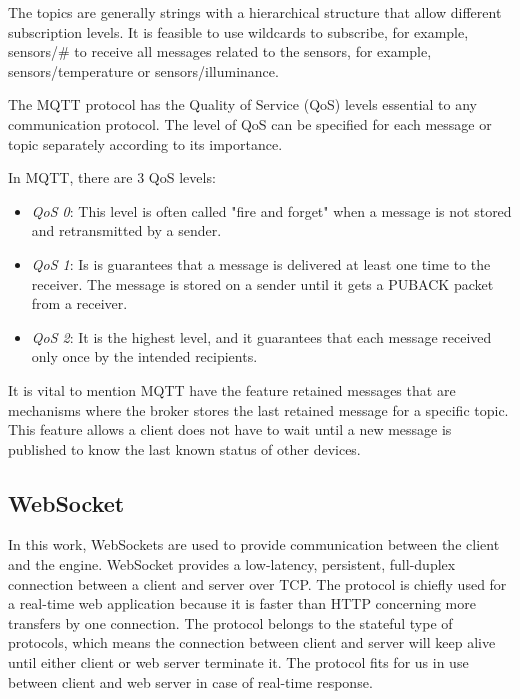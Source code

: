 The topics are generally strings with a hierarchical structure that allow different subscription levels. It is feasible to use wildcards to subscribe, for example, sensors/\# to receive all messages related to the sensors, for example, sensors/temperature or sensors/illuminance.

The MQTT protocol has the Quality of Service (QoS) levels essential to any communication protocol.  The level of QoS can be specified for each message or topic separately according to its importance.

In MQTT, there are 3 QoS levels:

\begin{itemize}
	\item \textit{QoS 0}: This level is often called "fire and forget" when a message is not stored and retransmitted by a sender.
	\item \textit{QoS 1}: Is is guarantees that a message is delivered at least one time to the receiver. The message is stored on a sender until it gets a PUBACK packet from a receiver.
	\item \textit{QoS 2}: It is the highest level, and it guarantees that each message received only once by the intended recipients.
\end{itemize}

It is vital to mention MQTT have the feature retained messages that are mechanisms where the broker stores the last retained message for a specific topic. This feature allows a client does not have to wait until a new message is published to know the last known status of other devices.
 
\subsection{WebSocket} \label{section:websocket}
 
In this work, WebSockets are used to provide communication between the client and the engine. WebSocket provides a low-latency, persistent, full-duplex connection between a client and server over TCP. The protocol is chiefly used for a real-time web application because it is faster than HTTP concerning more transfers by one connection. The protocol belongs to the stateful type of protocols, which means the connection between client and server will keep alive until either client or web server terminate it. The protocol fits for us in use between client and web server in case of real-time response.\citep{websocket_wang_salim_moskovits_2013}

